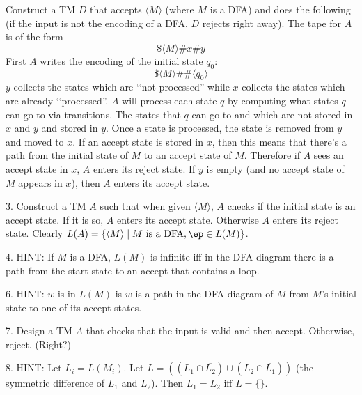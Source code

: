 Construct a TM $D$ that accepts $\langle M \rangle$
(where $M$ is a DFA) and does the following
(if the input is not the encoding of a DFA, $D$ rejects right away).
The tape for $A$ is of the form
\[
\$ \langle M \rangle \# x \# y
\]
First $A$ writes the encoding of the initial state $q_0$:
\[
\$ \langle M \rangle \# \# \langle q_0 \rangle
\]
$y$ collects the states which are \lq\lq not processed''
while $x$ collects the states which are already \lq\lq processed''.
$A$ will process each state $q$ by computing what states
$q$ can go to via transitions.
The states that $q$ can go to and which are not stored in $x$ and $y$
and stored in $y$.
Once a state is processed, the state is removed from $y$ and
moved to $x$.
If an accept state is stored in $x$, then this means that
there's a path from the initial state of $M$ to 
an accept state of $M$.
Therefore if $A$ sees an accept state in $x$, $A$ enters its reject state.
If $y$ is empty (and no accept state of $M$ appears in $x$),
then $A$ enters its accept state.

3. Construct a TM $A$ such that
when given $\langle M \rangle$, $A$ checks if the initial state is an accept
state. If it is so, $A$ enters its accept state.
Otherwise $A$ enters its reject state.
Clearly $L(A) = \{ \langle M \rangle \mid M \text{ is a DFA},
\ep \in L(M)\}$.

4. HINT:
If $M$ is a DFA, $L(M)$ is infinite iff in the DFA diagram
there is a path from the start state to an accept that contains a loop.


6. HINT: $w$ is in $L(M)$ is $w$ is a path in the DFA diagram of $M$
from $M$'s initial state to one of its accept states.

7. Design a TM $A$ that checks that the input is valid and then
accept. Otherwise, reject. (Right?)

8. HINT: Let $L_i = L(M_i)$.
Let $L = ((L_1 \cap \overline{L_2}) \cup (L_2 \cap \overline{L_1}))$
(the symmetric difference of $L_1$ and $L_2$).
Then $L_1 = L_2$ iff $L = \{\}$.

